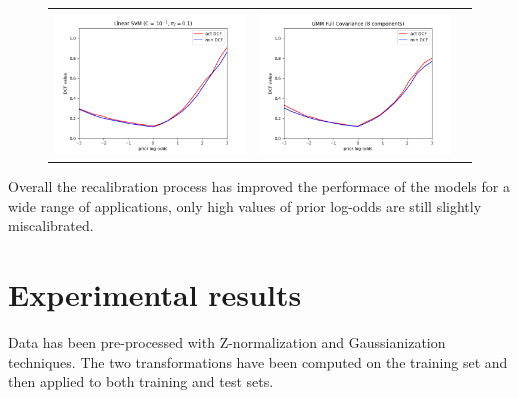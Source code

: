 \documentclass[12pt,a4paper]{article}
\begin{document}
\begin{figure}[H]
    \begin{center}
        \hspace*{-25pt}
        \begin{tabular}{ccc}
            \includegraphics[width = 200pt]{img/bayes/recalibrated-svm.png} &
            \includegraphics[width = 200pt]{img/bayes/recalibrated-gmm.png}   \\
        \end{tabular}
    \end{center}
\end{figure}

Overall the recalibration process has improved the performace of the models for a wide range of applications, only high values of prior log-odds are still slightly miscalibrated.

\section{Experimental results}

Data has been pre-processed with Z-normalization and Gaussianization techniques.
The two transformations have been computed on the training set and then applied to both training and test sets.
\end{document}
